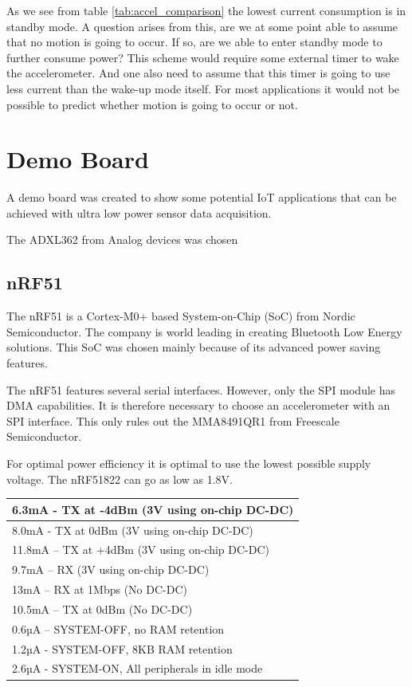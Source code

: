 As we see from table \ref{tab:accel_comparison} the lowest current consumption is in standby mode. A question arises from this, are we at some point able to assume that no motion is going to occur. If so, are we able to enter standby mode to further consume power? This scheme would require some external timer to wake the accelerometer. And one also need to assume that this timer is going to use less current than the wake-up mode itself. For most applications it would not be possible to predict whether motion is going to occur or not.

\section{Demo Board}

A demo board was created to show some potential IoT applications that can be achieved with ultra low power sensor data acquisition. 

The ADXL362 from Analog devices was chosen 

\subsection{nRF51}

The nRF51 is a Cortex-M0+ based System-on-Chip (SoC) from Nordic Semiconductor. The company is world leading in creating Bluetooth Low Energy solutions. This SoC was chosen mainly because of its advanced power saving features. 

The nRF51 features several serial interfaces. However, only the SPI module has DMA capabilities. It is therefore necessary to choose an accelerometer with an SPI interface. This only rules out the MMA8491QR1 from Freescale Semiconductor.

For optimal power efficiency it is optimal to use the lowest possible supply voltage. The nRF51822 can go as low as 1.8V.

\begin{center}
    \begin{tabular}{| l |}
    \hline
    6.3mA - TX at -4dBm (3V using on-chip DC-DC) \\ \hline
    8.0mA - TX at 0dBm (3V using on-chip DC-DC) \\ \hline
    11.8mA – TX at +4dBm (3V using on-chip DC-DC) \\ \hline
    9.7mA – RX (3V using on-chip DC-DC) \\ \hline
    13mA – RX at 1Mbps (No DC-DC) \\ \hline
    10.5mA – TX at 0dBm (No DC-DC) \\ \hline
    0.6µA – SYSTEM-OFF, no RAM retention \\ \hline
    1.2µA - SYSTEM-OFF, 8KB RAM retention \\ \hline
    2.6µA - SYSTEM-ON, All peripherals in idle mode \\ \hline
    \end{tabular}
\end{center}

